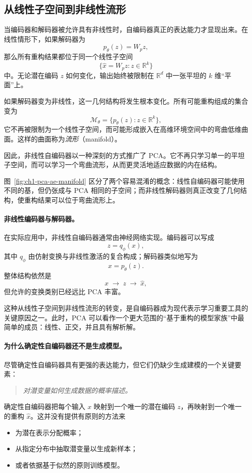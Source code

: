 \subsection{从线性子空间到非线性流形}

当编码器和解码器被允许具有非线性时，自编码器真正的表达能力才显现出来。在线性情形下，如果解码器为
\[
p_\theta(z)=W_pz,
\]
那么所有重构结果都位于同一个线性子空间
\[
\{\hat{x}=W_pz:z\in\mathbb{R}^k\}
\]
中。无论潜在编码 \(z\) 如何变化，输出始终被限制在 \(\mathbb{R}^d\) 中一张平坦的 \(k\) 维“平面”上。

如果解码器变为非线性，这一几何结构将发生根本变化。所有可能重构组成的集合变为
\[
\mathcal{M}_\theta
=
\{p_\theta(z):z\in\mathbb{R}^k\},
\]
它不再被限制为一个线性子空间，而可能形成嵌入在高维环境空间中的弯曲低维曲面。这样的曲面称为\emph{流形}（manifold）。

因此，非线性自编码器以一种深刻的方式推广了 PCA。它不再只学习单一的平坦子空间，而可以学习一个弯曲流形，从而更灵活地适应数据的内在结构。

图~\ref{fig:ch1-pca-ae-manifold} 区分了两个容易混淆的概念：线性自编码器可能使用不同的基，但仍张成与 PCA 相同的子空间；而非线性解码器则真正改变了几何结构，使重构结果可以位于弯曲流形上。



\paragraph{非线性编码器与解码器。}
在实际应用中，非线性自编码器通常由神经网络实现。编码器可以写成
\[
z=q_\phi(x),
\]
其中 \(q_\phi\) 由仿射变换与非线性激活的复合构成；解码器类似地写为
\[
\hat{x}=p_\theta(z).
\]
整体结构依然是
\[
x\;\longrightarrow\;z\;\longrightarrow\;\hat{x},
\]
但允许的变换类别已经远比 PCA 丰富。

这种从线性子空间到非线性流形的转变，是自编码器成为现代表示学习重要工具的关键原因之一。此时，PCA 可以看作一个更大范围的“基于重构的模型家族”中最简单的成员：线性、正交，并且具有解析解。

\paragraph{为什么确定性自编码器还不是生成模型。}
尽管确定性自编码器具有更强的表达能力，但它们仍缺少生成建模的一个关键要素：
\begin{quote}
\emph{对潜变量如何生成数据的概率描述。}
\end{quote}

确定性自编码器把每个输入 \(x\) 映射到一个唯一的潜在编码 \(z\)，再映射到一个唯一的重构 \(\hat{x}\)。这并没有提供有原则的方法来
\begin{itemize}
    \item 为潜在表示分配概率；
    \item 从指定分布中抽取潜变量以生成新样本；
    \item 或者依据基于似然的原则训练模型。
\end{itemize}


